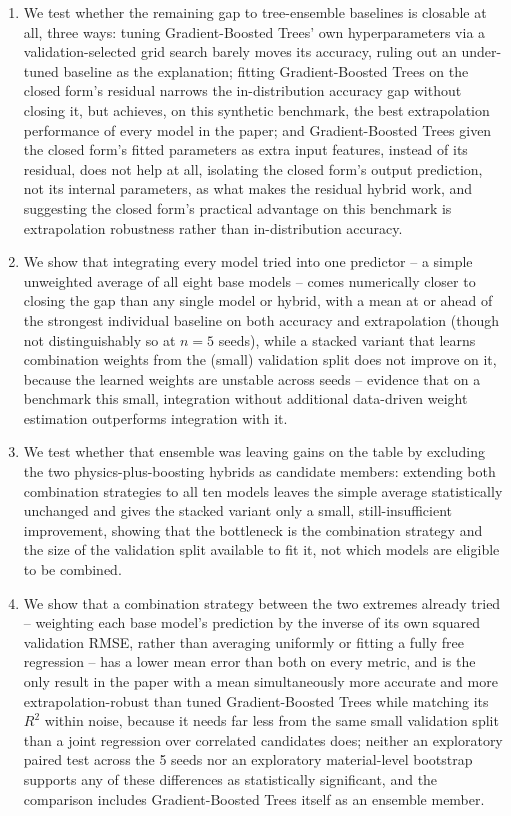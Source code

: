 \documentclass[11pt]{article}
\begin{document}
\begin{enumerate}
\item We test whether the remaining gap to tree-ensemble baselines is closable at all, three ways: tuning Gradient-Boosted Trees' own hyperparameters via a validation-selected grid search barely moves its accuracy, ruling out an under-tuned baseline as the explanation; fitting Gradient-Boosted Trees on the closed form's residual narrows the in-distribution accuracy gap without closing it, but achieves, on this synthetic benchmark, the best extrapolation performance of every model in the paper; and Gradient-Boosted Trees given the closed form's fitted parameters as extra input features, instead of its residual, does not help at all, isolating the closed form's output prediction, not its internal parameters, as what makes the residual hybrid work, and suggesting the closed form's practical advantage on this benchmark is extrapolation robustness rather than in-distribution accuracy.
\item We show that integrating every model tried into one predictor -- a simple unweighted average of all eight base models -- comes numerically closer to closing the gap than any single model or hybrid, with a mean at or ahead of the strongest individual baseline on both accuracy and extrapolation (though not distinguishably so at $n=5$ seeds), while a stacked variant that learns combination weights from the (small) validation split does not improve on it, because the learned weights are unstable across seeds -- evidence that on a benchmark this small, integration without additional data-driven weight estimation outperforms integration with it.
\item We test whether that ensemble was leaving gains on the table by excluding the two physics-plus-boosting hybrids as candidate members: extending both combination strategies to all ten models leaves the simple average statistically unchanged and gives the stacked variant only a small, still-insufficient improvement, showing that the bottleneck is the combination strategy and the size of the validation split available to fit it, not which models are eligible to be combined.
\item We show that a combination strategy between the two extremes already tried -- weighting each base model's prediction by the inverse of its own squared validation RMSE, rather than averaging uniformly or fitting a fully free regression -- has a lower mean error than both on every metric, and is the only result in the paper with a mean simultaneously more accurate and more extrapolation-robust than tuned Gradient-Boosted Trees while matching its $R^2$ within noise, because it needs far less from the same small validation split than a joint regression over correlated candidates does; neither an exploratory paired test across the 5 seeds nor an exploratory material-level bootstrap supports any of these differences as statistically significant, and the comparison includes Gradient-Boosted Trees itself as an ensemble member.
\end{enumerate}
\end{document}
